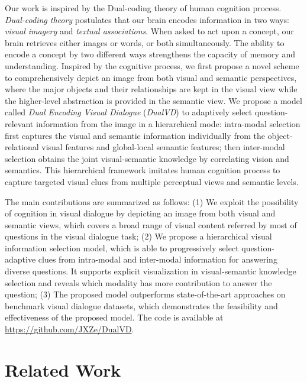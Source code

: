 \documentclass[letterpaper]{article} \usepackage{aaai20}  \usepackage{times}  \usepackage{helvet} \usepackage{courier}  \usepackage[hyphens]{url}  \usepackage{graphicx} \urlstyle{rm} \def\UrlFont{\rm}  \usepackage{graphicx}  \frenchspacing  \setlength{\pdfpagewidth}{8.5in}  \setlength{\pdfpageheight}{11in}  \usepackage{mathrsfs} \usepackage{amsfonts,amssymb}  \usepackage{tabularx} \usepackage{url}
\begin{document}
Our work is inspired by the Dual-coding theory \cite{paivio1971imagery} of human cognition process. \textit{Dual-coding theory}  postulates that our brain encodes information in two ways: \textit{visual imagery} and \textit{textual associations}.  When asked to act upon a concept, our brain retrieves either images or words, or both simultaneously. The ability to encode a concept by two different ways strengthens the capacity of memory and understanding. Inspired by the cognitive process, we first propose a novel scheme to comprehensively depict an image from  both  visual  and  semantic  perspectives, where the major objects and their relationships are kept in the visual view while the higher-level abstraction is provided in the semantic view. We propose a model called \textit{Dual Encoding Visual Dialogue} (\textit{DualVD}) to adaptively select question-relevant information from the image in a hierarchical mode: intra-modal selection first captures the visual and semantic information individually from the object-relational visual features and global-local semantic features; then inter-modal selection obtains the joint visual-semantic knowledge by correlating vision and semantics. This hierarchical framework imitates human cognition process to capture targeted visual clues from multiple perceptual views and semantic levels. 




The main contributions are summarized as follows: (1) We exploit the possibility of cognition in visual dialogue by depicting an image from both visual and semantic views, which covers a broad range of visual content referred by most of questions in the visual dialogue task; (2) We propose a hierarchical visual information selection model, which is able to progressively select question-adaptive clues from intra-modal and inter-modal information for answering diverse questions. 
It supports explicit visualization in visual-semantic knowledge selection and reveals which modality has more contribution to answer the question; (3) The proposed model outperforms state-of-the-art approaches on benchmark visual dialogue datasets, which demonstrates the feasibility and effectiveness of the proposed model. The code is available at \url{https://github.com/JXZe/DualVD}.












\section{Related Work}
\end{document}
